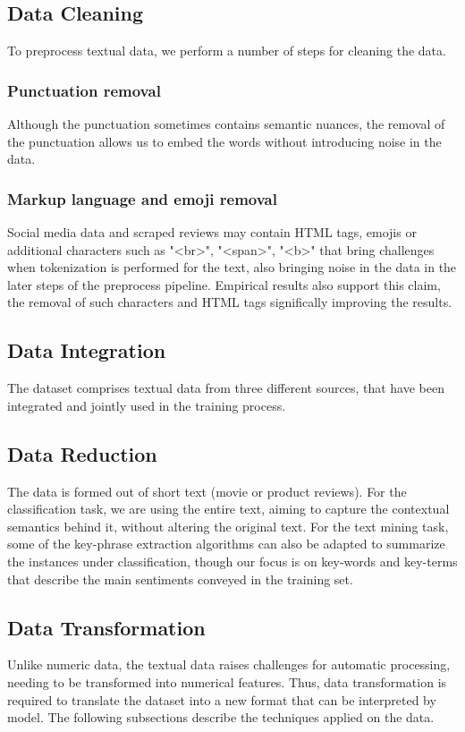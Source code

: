 \subsection{Data Cleaning}
To preprocess textual data, we perform a number of steps for cleaning the data. 

\subsubsection{Punctuation removal}
Although the punctuation sometimes contains semantic nuances, the removal of the punctuation allows us to embed the words without introducing noise in the data.
\subsubsection{Markup language and emoji removal}
Social media data and scraped reviews may contain HTML tags, emojis or additional characters such as "\textless br\textgreater", "\textless span\textgreater", "\textless b\textgreater" that bring challenges when tokenization is performed for the text, also bringing noise in the data in the later steps of the preprocess pipeline. Empirical results also support this claim, the removal of such characters and HTML tags significally improving the results.


\subsection{Data Integration}
The dataset comprises textual data from three different sources, that have been integrated and jointly used in the training process.

\subsection{Data Reduction}
The data is formed out of short text (movie or product reviews). For the classification task, we are using the entire text, aiming to capture the contextual semantics behind it, without altering the original text. For the text mining task, some of the key-phrase extraction algorithms can also be adapted to summarize the instances under classification, though our focus is on key-words and key-terms that describe the main sentiments conveyed in the training set.

\subsection{Data Transformation}
Unlike numeric data, the textual data raises challenges for automatic processing, needing to be transformed into numerical features. Thus, data transformation is required to translate the dataset into a new format that can be interpreted by model. The following subsections describe the techniques applied on the data.

